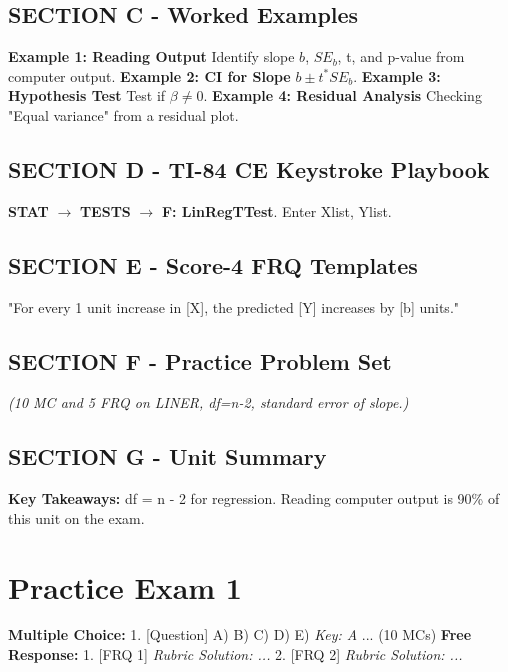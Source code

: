 \section{SECTION C - Worked Examples}
\textbf{Example 1: Reading Output} Identify slope $b$, $SE_b$, t, and p-value from computer output.
\textbf{Example 2: CI for Slope} $b \pm t^* SE_b$.
\textbf{Example 3: Hypothesis Test} Test if $\beta \neq 0$.
\textbf{Example 4: Residual Analysis} Checking "Equal variance" from a residual plot.

\section{SECTION D - TI-84 CE Keystroke Playbook}
\begin{calculatorbox}[LinRegTTest]
\textbf{STAT} $\rightarrow$ \textbf{TESTS} $\rightarrow$ \textbf{F: LinRegTTest}. Enter Xlist, Ylist.
\end{calculatorbox}

\section{SECTION E - Score-4 FRQ Templates}
\begin{frqrubricbox}
"For every 1 unit increase in [X], the predicted [Y] increases by [b] units."
\end{frqrubricbox}

\section{SECTION F - Practice Problem Set}
\begin{workbookbox}
\textit{(10 MC and 5 FRQ on LINER, df=n-2, standard error of slope.)}
\end{workbookbox}

\section{SECTION G - Unit Summary}
\begin{lessonbox}
\textbf{Key Takeaways:} df = n - 2 for regression. Reading computer output is 90\% of this unit on the exam.
\end{lessonbox}

\chapter{Practice Exam 1}
\textbf{Multiple Choice:}
1. [Question] A) B) C) D) E) \textit{Key: A}
... (10 MCs)
\textbf{Free Response:}
1. [FRQ 1] \textit{Rubric Solution: ...}
2. [FRQ 2] \textit{Rubric Solution: ...}

